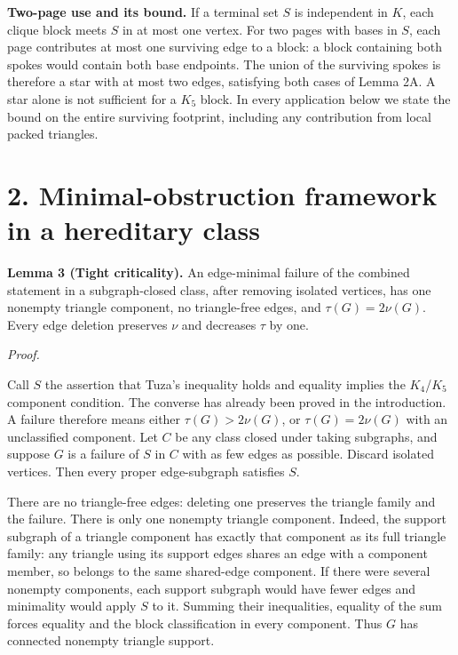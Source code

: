 \documentclass[11pt]{article}
\begin{document}
\textbf{Two-page use and its bound.} If a terminal set \(S\) is
independent in \(K\), each clique block meets \(S\) in at most one
vertex. For two pages with bases in \(S\), each page contributes at most
one surviving edge to a block: a block containing both spokes would
contain both base endpoints. The union of the surviving spokes is
therefore a star with at most two edges, satisfying both cases of Lemma
2A. A star alone is not sufficient for a \(K_5\) block. In every
application below we state the bound on the entire surviving footprint,
including any contribution from local packed triangles.

\section{2. Minimal-obstruction framework in a hereditary
class}\label{minimal-obstruction-framework-in-a-hereditary-class}

\textbf{Lemma 3 (Tight criticality).} An edge-minimal failure of the
combined statement in a subgraph-closed class, after removing isolated
vertices, has one nonempty triangle component, no triangle-free edges,
and \(\tau(G)=2\nu(G)\). Every edge deletion preserves \(\nu\) and
decreases \(\tau\) by one.

\emph{Proof.}

Call \(S\) the assertion that Tuza's inequality holds and equality
implies the \(K_4\)/\(K_5\) component condition. The converse has
already been proved in the introduction. A failure therefore means
either \(\tau(G)>2\nu(G)\), or \(\tau(G)=2\nu(G)\) with an unclassified
component. Let \(C\) be any class closed under taking subgraphs, and
suppose \(G\) is a failure of \(S\) in \(C\) with as few edges as
possible. Discard isolated vertices. Then every proper edge-subgraph
satisfies \(S\).

There are no triangle-free edges: deleting one preserves the triangle
family and the failure. There is only one nonempty triangle component.
Indeed, the support subgraph of a triangle component has exactly that
component as its full triangle family: any triangle using its support
edges shares an edge with a component member, so belongs to the same
shared-edge component. If there were several nonempty components, each
support subgraph would have fewer edges and minimality would apply \(S\)
to it. Summing their inequalities, equality of the sum forces equality
and the block classification in every component. Thus \(G\) has
connected nonempty triangle support.
\end{document}
